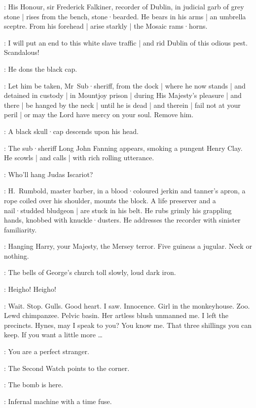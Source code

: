 :
His Honour,
sir Frederick Falkiner,
recorder of Dublin,
in judicial garb of grey stone |
rises from the bench,
stone·bearded.
He bears in his arms |
an umbrella sceptre.
From his forehead |
arise starkly |
the Mosaic rams·horns.

\Recorder:
I will put an end to this white slave traffic |
and rid Dublin of this odious pest.
Scandalous!

:
He dons the black cap.

\Recorder:
Let him be taken,
Mr~Sub·sheriff,
from the dock |
where he now stands |
and detained in custody |
in Mountjoy prison |
during His Majesty's pleasure |
and there |
be hanged by the neck |
until he is dead |
and therein |
fail not at your peril |
or may the Lord have mercy on your soul.
Remove him.

:
A black skull·cap descends upon his head.

:
The sub·sheriff Long John Fanning appears,
smoking a pungent Henry Clay.
He scowls |
and calls |
with rich rolling utterance.

\LongJohn:
Who'll hang Judas Iscariot?

:
H.~Rumbold,
master barber,
in a blood·coloured jerkin and tanner's apron,
a rope coiled over his shoulder,
mounts the block.
A life preserver and a nail·studded bludgeon |
are stuck in his belt.
He rubs grimly his grappling hands,
knobbed with knuckle·dusters.
He addresses the recorder with sinister familiarity.

\Rumbold:
Hanging Harry,
your Majesty,
the Mersey terror.
Five guineas a jugular.
Neck or nothing.

:
The bells of George's church toll slowly,
loud dark iron.

\Bells:
Heigho!
Heigho!

\Bloom:
Wait.
Stop.
Gulls.
Good heart.
I saw.
Innocence.
Girl in the monkeyhouse.
Zoo.
Lewd chimpanzee.
Pelvic basin.
Her artless blush unmanned me.
I left the precincts.
Hynes,
may I speak to you?
You know me.
That three shillings you can keep.
If you want a little more \ldots

\Hynes[1]:
You are a perfect stranger.

:
The Second Watch points to the corner.

\SecondWatch:
The bomb is here.

\FirstWatch:
Infernal machine with a time fuse.

